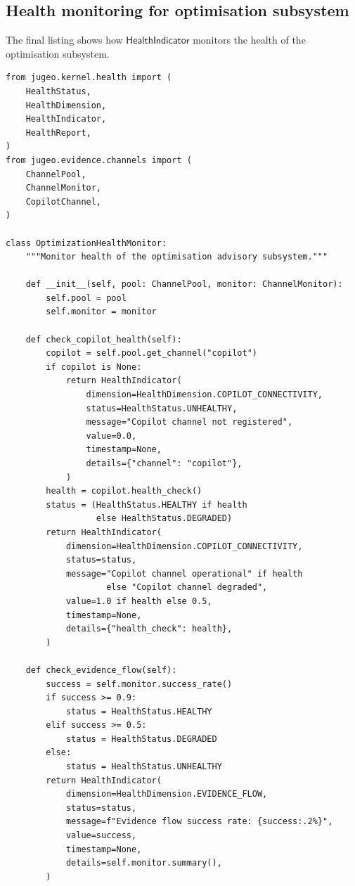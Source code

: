 \documentclass[11pt]{article}
\newcommand{\HealthInd}{\mathsf{HealthIndicator}}
\begin{document}
\subsection{Health monitoring for optimisation subsystem}

The final listing shows how $\HealthInd$ monitors
the health of the optimisation subsystem.

\begin{lstlisting}[style=jugeo-python,
  caption={Health monitoring for the optimisation subsystem},
  label={lst:opthealth}]
from jugeo.kernel.health import (
    HealthStatus,
    HealthDimension,
    HealthIndicator,
    HealthReport,
)
from jugeo.evidence.channels import (
    ChannelPool,
    ChannelMonitor,
    CopilotChannel,
)

class OptimizationHealthMonitor:
    """Monitor health of the optimisation advisory subsystem."""

    def __init__(self, pool: ChannelPool, monitor: ChannelMonitor):
        self.pool = pool
        self.monitor = monitor

    def check_copilot_health(self):
        copilot = self.pool.get_channel("copilot")
        if copilot is None:
            return HealthIndicator(
                dimension=HealthDimension.COPILOT_CONNECTIVITY,
                status=HealthStatus.UNHEALTHY,
                message="Copilot channel not registered",
                value=0.0,
                timestamp=None,
                details={"channel": "copilot"},
            )
        health = copilot.health_check()
        status = (HealthStatus.HEALTHY if health
                  else HealthStatus.DEGRADED)
        return HealthIndicator(
            dimension=HealthDimension.COPILOT_CONNECTIVITY,
            status=status,
            message="Copilot channel operational" if health
                    else "Copilot channel degraded",
            value=1.0 if health else 0.5,
            timestamp=None,
            details={"health_check": health},
        )

    def check_evidence_flow(self):
        success = self.monitor.success_rate()
        if success >= 0.9:
            status = HealthStatus.HEALTHY
        elif success >= 0.5:
            status = HealthStatus.DEGRADED
        else:
            status = HealthStatus.UNHEALTHY
        return HealthIndicator(
            dimension=HealthDimension.EVIDENCE_FLOW,
            status=status,
            message=f"Evidence flow success rate: {success:.2%}",
            value=success,
            timestamp=None,
            details=self.monitor.summary(),
        )


\end{lstlisting}
\end{document}
